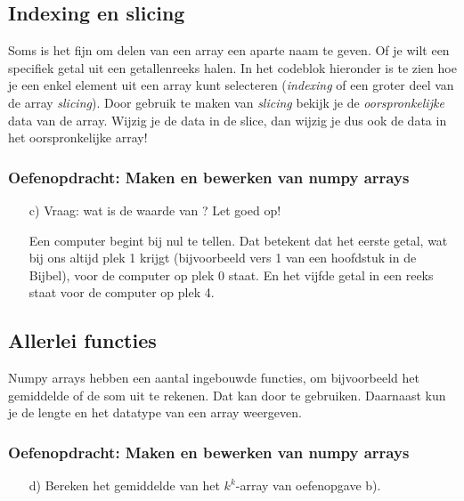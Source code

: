 \documentclass[a4paper,11pt, fleqn]{article}
\begin{document}
\subsection{Indexing en slicing}
Soms is het fijn om delen van een array een aparte naam te geven. Of je wilt een specifiek getal uit een getallenreeks halen. In het codeblok hieronder is te zien hoe je een enkel element uit een array kunt selecteren {(\it indexing} of een groter deel van de array {\it slicing}). Door gebruik te maken van {\it slicing} bekijk je de {\it oorspronkelijke} data van de array. Wijzig je de data in de slice, dan wijzig je dus ook de data in het oorspronkelijke array!


\subsubsection*{Oefenopdracht: Maken en bewerken van numpy arrays}
\begin{itemize}
	\item[c)] Vraag: wat is de waarde van ? Let goed op!
	
	Een computer begint bij nul te tellen. Dat betekent dat het eerste getal, wat bij ons altijd plek 1 krijgt (bijvoorbeeld vers 1 van een hoofdstuk in de Bijbel), voor de computer op plek 0 staat. En het vijfde getal in een reeks staat voor de computer op plek 4.
\end{itemize}

\subsection{Allerlei functies}
Numpy arrays hebben een aantal ingebouwde functies, om bijvoorbeeld het gemiddelde of de som uit te rekenen. Dat kan door  te gebruiken. Daarnaast kun je de lengte en het datatype van een array weergeven.


\subsubsection*{Oefenopdracht: Maken en bewerken van numpy arrays}
\begin{itemize}
	\item[d)] Bereken het gemiddelde van het $k^k$-array van oefenopgave b).
\end{itemize}
\end{document}

